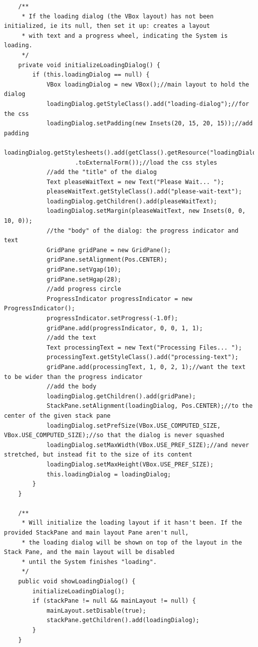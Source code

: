 \begin{lstlisting}
    /**
     * If the loading dialog (the VBox layout) has not been initialized, ie its null, then set it up: creates a layout
     * with text and a progress wheel, indicating the System is loading.
     */
    private void initializeLoadingDialog() {
        if (this.loadingDialog == null) {
            VBox loadingDialog = new VBox();//main layout to hold the dialog
            loadingDialog.getStyleClass().add("loading-dialog");//for the css
            loadingDialog.setPadding(new Insets(20, 15, 20, 15));//add padding
            loadingDialog.getStylesheets().add(getClass().getResource("loadingDialog.css")
            		.toExternalForm());//load the css styles
            //add the "title" of the dialog
            Text pleaseWaitText = new Text("Please Wait... ");
            pleaseWaitText.getStyleClass().add("please-wait-text");
            loadingDialog.getChildren().add(pleaseWaitText);
            loadingDialog.setMargin(pleaseWaitText, new Insets(0, 0, 10, 0));
            //the "body" of the dialog: the progress indicator and text
            GridPane gridPane = new GridPane();
            gridPane.setAlignment(Pos.CENTER);
            gridPane.setVgap(10);
            gridPane.setHgap(28);
            //add progress circle
            ProgressIndicator progressIndicator = new ProgressIndicator();
            progressIndicator.setProgress(-1.0f);
            gridPane.add(progressIndicator, 0, 0, 1, 1);
            //add the text
            Text processingText = new Text("Processing Files... ");
            processingText.getStyleClass().add("processing-text");
            gridPane.add(processingText, 1, 0, 2, 1);//want the text to be wider than the progress indicator
            //add the body
            loadingDialog.getChildren().add(gridPane);
            StackPane.setAlignment(loadingDialog, Pos.CENTER);//to the center of the given stack pane
            loadingDialog.setPrefSize(VBox.USE_COMPUTED_SIZE, VBox.USE_COMPUTED_SIZE);//so that the dialog is never squashed
            loadingDialog.setMaxWidth(VBox.USE_PREF_SIZE);//and never stretched, but instead fit to the size of its content
            loadingDialog.setMaxHeight(VBox.USE_PREF_SIZE);
            this.loadingDialog = loadingDialog;
        }
    }

    /**
     * Will initialize the loading layout if it hasn't been. If the provided StackPane and main layout Pane aren't null,
     * the loading dialog will be shown on top of the layout in the Stack Pane, and the main layout will be disabled
     * until the System finishes "loading".
     */
    public void showLoadingDialog() {
        initializeLoadingDialog();
        if (stackPane != null && mainLayout != null) {
            mainLayout.setDisable(true);
            stackPane.getChildren().add(loadingDialog);
        }
    }


\end{lstlisting}

